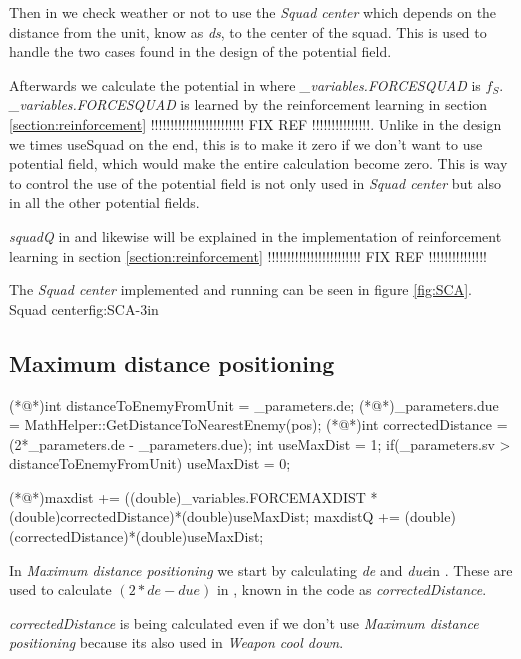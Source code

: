 		Then in  we check weather or not to use the \textit{Squad center} which depends on the distance from the unit, know as \textit{ds}, to the center of the squad. This is used to handle the two cases found in the design of the potential field. 
		
		Afterwards we calculate the potential in  where \textit{\_variables.FORCESQUAD} is $f_{S}$. \textit{\_variables.FORCESQUAD} is learned by the reinforcement learning in section \ref{section:reinforcement} !!!!!!!!!!!!!!!!!!!!!!!! FIX REF !!!!!!!!!!!!!!!. 
		Unlike in the design we times useSquad on the end, this is to make it zero if we don't want to use potential field, which would make the entire calculation become zero. This is way to control the use of the potential field is not only used in \textit{Squad center} but also in all the other potential fields.
		
		\textit{squadQ} in  and likewise will be explained in the implementation of reinforcement learning in section \ref{section:reinforcement} !!!!!!!!!!!!!!!!!!!!!!!! FIX REF !!!!!!!!!!!!!!!
		
		The \textit{Squad center} implemented and running can be seen in figure \ref{fig:SCA}.
			{Squad center}{fig:SCA}{-3in}
			
	\subsection{Maximum distance positioning}
		\begin{Sourcecode}[caption=Maximum distance]
(*@\lnote@*)int distanceToEnemyFromUnit = _parameters.de;
(*@\lnote@*)_parameters.due = MathHelper::GetDistanceToNearestEnemy(pos);
(*@\lnote@*)int correctedDistance = (2*_parameters.de - _parameters.due);
int useMaxDist = 1;
if(_parameters.sv > distanceToEnemyFromUnit)
	useMaxDist = 0;

(*@\lnote@*)maxdist += ((double)_variables.FORCEMAXDIST * (double)correctedDistance)*(double)useMaxDist;
maxdistQ += (double)(correctedDistance)*(double)useMaxDist;
\end{Sourcecode}
	
	In \textit{Maximum distance positioning} we start by calculating \textit{de} and \textit{due}in  . These are used to calculate $(2*de - due)$ in , known in the code as \textit{correctedDistance}. 
	
	\textit{correctedDistance} is being calculated even if we don't use \textit{Maximum distance positioning} because its also used in \textit{Weapon cool down}. 
	
